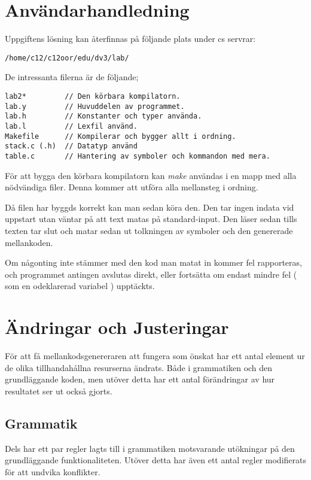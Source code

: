 \section{Användarhandledning}
	\label{Sec:anv}

	Uppgiftens lösning kan återfinnas på följande plats under cs servrar:
\begin{verbatim}
/home/c12/c12oor/edu/dv3/lab/
\end{verbatim}
	De intressanta filerna är de följande;
\begin{verbatim}
lab2*         // Den körbara kompilatorn.
lab.y         // Huvuddelen av programmet.
lab.h         // Konstanter och typer använda.
lab.l         // Lexfil använd.
Makefile      // Kompilerar och bygger allt i ordning.
stack.c (.h)  // Datatyp använd
table.c       // Hantering av symboler och kommandon med mera.
\end{verbatim}

	För att bygga den körbara kompilatorn kan \textit{make} användas i en mapp med alla nödvändiga filer. Denna kommer att utföra alla mellansteg i ordning.
	
	Då filen har byggds korrekt kan man sedan köra den. Den tar ingen indata vid uppstart utan väntar på att text matas på standard-input. Den läser sedan tills texten tar slut och matar sedan ut tolkningen av symboler och den genererade mellankoden.	
	
	Om någonting inte stämmer med den kod man matat in kommer fel rapporteras, och programmet antingen avslutas direkt, eller fortsätta om endast mindre fel ( som en odeklarerad variabel ) upptäckts.

\pagebreak

\section{ Ändringar och Justeringar }
	För att få mellankodsgenereraren att fungera som önskat har ett antal 
	element ur de olika tillhandahållna resurserna ändrats. Både i grammatiken
	och den grundläggande koden, men utöver detta har ett antal förändringar av hur
	resultatet ser ut också gjorts.

	\subsection{Grammatik}
		Dels har ett par regler lagts till i grammatiken motsvarande utökningar
		på den grundläggande funktionaliteten. Utöver detta har även ett antal regler 
		modifierats för att undvika konflikter.
		
